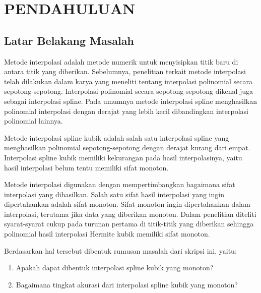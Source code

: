 \chapter{PENDAHULUAN}
\section{Latar Belakang Masalah}

Metode interpolasi adalah metode numerik untuk menyisipkan titik baru di antara titik yang diberikan. Sebelumnya, penelitian terkait metode interpolasi telah dilakukan dalam karya  yang meneliti tentang interpolasi polinomial secara sepotong-sepotong. Interpolasi polinomial secara sepotong-sepotong dikenal juga sebagai interpolasi spline. Pada umumnya metode interpolasi spline menghasilkan polinomial interpolasi dengan derajat yang lebih kecil dibandingkan interpolasi polinomial lainnya.

Metode interpolasi spline kubik adalah salah satu interpolasi spline yang menghasilkan polinomial sepotong-sepotong dengan derajat kurang dari empat. Interpolasi spline kubik memiliki kekurangan pada hasil interpolasinya, yaitu hasil interpolasi belum tentu memiliki sifat monoton.

Metode interpolasi digunakan dengan mempertimbangkan bagaimana sifat interpolasi yang dihasilkan. Salah satu sifat hasil interpolasi yang ingin dipertahankan adalah sifat monoton. Sifat monoton ingin dipertahankan dalam interpolasi, terutama jika data yang diberikan monoton. Dalam penelitian  diteliti syarat-syarat cukup pada turunan pertama di titik-titik yang diberikan sehingga polinomial hasil interpolasi Hermite kubik memiliki sifat monoton.

Berdasarkan hal tersebut dibentuk rumusan masalah dari skripsi ini, yaitu:
\begin{enumerate}
    \item Apakah dapat dibentuk interpolasi spline kubik yang monoton?
    \item Bagaimana tingkat akurasi dari interpolasi spline kubik yang monoton?
\end{enumerate}



